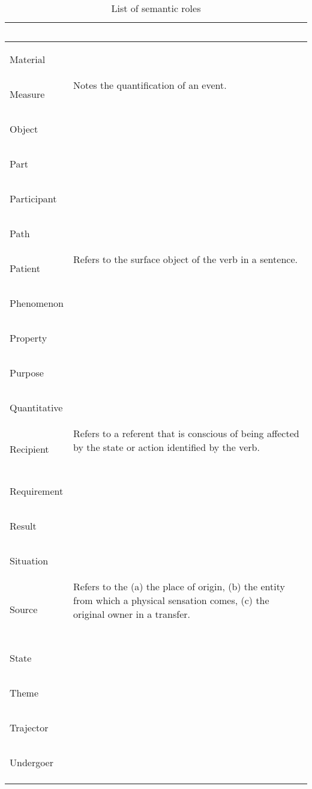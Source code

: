 \documentclass[a4paper,11pt, onecolumn,twoside]{article}
\begin{document}
\begin{longtable}{ p{}  p{} }
        & ~ \\
\midrule
 \multirow{2}{*}{Material} & ~ \\ 
        & ~ \\
\midrule
 \multirow{2}{*}{Measure} & Notes the quantification of an event. \\ 
        & ~ \\
\midrule
 \multirow{2}{*}{Object} & ~ \\ 
        & ~ \\
\midrule
 \multirow{2}{*}{Part} & ~ \\ 
        & ~ \\
\midrule
 \multirow{2}{*}{Participant} & ~ \\ 
        & ~ \\
\midrule
 \multirow{2}{*}{Path} & ~ \\ 
        & ~ \\
\midrule
 \multirow{2}{*}{Patient} & Refers to the surface object of the verb in a sentence. \\ 
        & ~ \\
\midrule
 \multirow{2}{*}{Phenomenon} & ~ \\ 
        & ~ \\
\midrule
 \multirow{2}{*}{Property} & ~ \\ 
        & ~ \\
\midrule
 \multirow{2}{*}{Purpose} & ~ \\ 
        & ~ \\
\midrule
 \multirow{2}{*}{Quantitative} & ~ \\ 
        & ~ \\
\midrule
 \multirow{2}{*}{Recipient} & Refers to a referent that is conscious of being affected by the state or action identified by the verb. \\ 
        & ~ \\
\midrule
 \multirow{2}{*}{Requirement} & ~ \\ 
        & ~ \\
\midrule
 \multirow{2}{*}{Result} & ~ \\ 
        & ~ \\
\midrule
 \multirow{2}{*}{Situation} & ~ \\ 
        & ~ \\
\midrule
 \multirow{2}{*}{Source} & Refers to the (a) the place of origin, (b) the entity from which a physical sensation comes, (c) the original owner in a transfer. \\ 
        & ~ \\
\midrule
 \multirow{2}{*}{State} & ~ \\ 
        & ~ \\
\midrule
 \multirow{2}{*}{Theme} & ~ \\ 
        & ~ \\
\midrule
 \multirow{2}{*}{Trajector} & ~ \\ 
        & ~ \\
\midrule
 \multirow{2}{*}{Undergoer} & ~ \\ 
        & ~ \\
\bottomrule
\caption{List of semantic roles}
\label{table:semroles}
\end{longtable}
\end{document}
